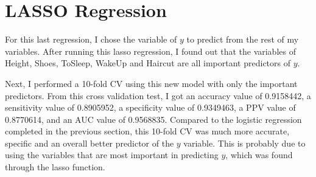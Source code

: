 \documentclass[]{article}
\newenvironment{Shaded}{\begin{snugshade}}{\end{snugshade}}
\newcommand{\DataTypeTok}[1]{\textcolor[rgb]{0.13,0.29,0.53}{#1}}
\newcommand{\DecValTok}[1]{\textcolor[rgb]{0.00,0.00,0.81}{#1}}
\newcommand{\FloatTok}[1]{\textcolor[rgb]{0.00,0.00,0.81}{#1}}
\newcommand{\KeywordTok}[1]{\textcolor[rgb]{0.13,0.29,0.53}{\textbf{#1}}}
\newcommand{\NormalTok}[1]{#1}
\newcommand{\OperatorTok}[1]{\textcolor[rgb]{0.81,0.36,0.00}{\textbf{#1}}}
\newcommand{\OtherTok}[1]{\textcolor[rgb]{0.56,0.35,0.01}{#1}}
\newcommand{\StringTok}[1]{\textcolor[rgb]{0.31,0.60,0.02}{#1}}
\begin{document}
\hypertarget{lasso-regression}{%
\section{LASSO Regression}\label{lasso-regression}}

For this last regression, I chose the variable of \(y\) to predict from
the rest of my variables. After running this lasso regression, I found
out that the variables of Height, Shoes, ToSleep, WakeUp and Haircut are
all important predictors of \(y\).

Next, I performed a 10-fold CV using this new model with only the
important predictors. From this cross validation test, I got an accuracy
value of 0.9158442, a sensitivity value of 0.8905952, a specificity
value of 0.9349463, a PPV value of 0.8770614, and an AUC value of
0.9568835. Compared to the logistic regression completed in the previous
section, this 10-fold CV was much more accurate, specific and an overall
better predictor of the \(y\) variable. This is probably due to using
the variables that are most important in predicting \(y\), which was
found through the lasso function.

\begin{Shaded}
\end{Shaded}
\end{document}
